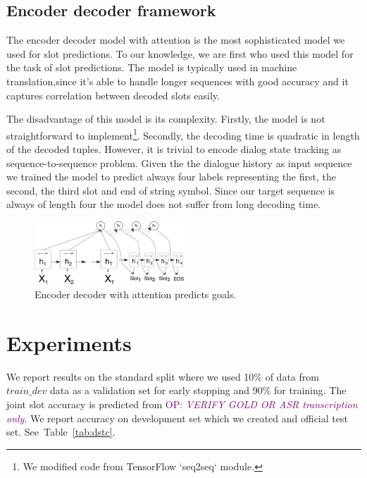 \documentclass{itatnew}
\def\OP#1{\textcolor{purple}{OP: \textit{#1}}}
\def\todo#1{\textcolor{purple}{todo: \textit{#1}}}
\begin{document}
\subsection{Encoder decoder framework}
\label{sec:encdec}
The encoder decoder model with attention\cite{bahdanau2014neural} is the most sophisticated model we used for slot predictions.
To our knowledge, we are first who used this model for the task of slot predictions.
The model is typically used in machine translation,since it's able to handle longer sequences with good accuracy and it captures correlation between decoded slots easily\cite{bahdanau2014neural}.

The disadvantage of this model is its complexity.
Firstly, the model is not straightforward to implement\footnote{We modified code from TensorFlow `seq2seq` module.}. Secondly, the decoding time is quadratic in length of the decoded tuples.
However, it is trivial to encode dialog state tracking as sequence-to-sequence problem. Given the the dialogue history as input sequence we trained the model to predict always four labels representing the first, the second, the third slot and end of string symbol.
Since our target sequence is always of length four the model does not suffer from long decoding time.
\begin{figure}
\includegraphics[width=0.5\textwidth]{encdec}
\caption{Encoder decoder with attention predicts goals.}
\label{fig:encdec}
\end{figure}

\section{Experiments}
\label{sec:exp}
We report results on the standard split where we used 10\% of data from $train\_dev$ data as a validation set for early stopping\cite{prechelt1998early} and 90\% for training.
The joint slot accuracy is predicted from \OP{VERIFY GOLD OR ASR transcription only}.
We report accuracy  on development set which we created and official test set. See~Table~\ref{tab:dstc}.
\end{document}
